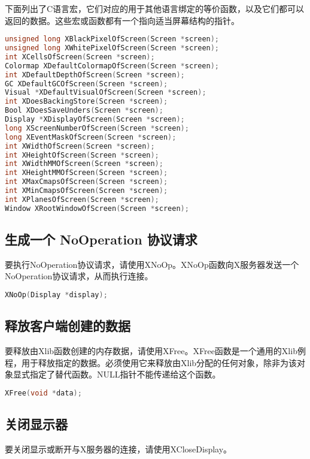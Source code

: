 \noindent 下面列出了C语言宏，它们对应的用于其他语言绑定的等价函数，以及它们都可以返回的数据。这些宏或函数都有一个指向适当屏幕结构的指针。
\begin{lstlisting}[language=C]
unsigned long XBlackPixelOfScreen(Screen *screen);
unsigned long XWhitePixelOfScreen(Screen *screen);
int XCellsOfScreen(Screen *screen);
Colormap XDefaultColormapOfScreen(Screen *screen);
int XDefaultDepthOfScreen(Screen *screen);
GC XDefaultGCOfScreen(Screen *screen);
Visual *XDefaultVisualOfScreen(Screen *screen);
int XDoesBackingStore(Screen *screen);
Bool XDoesSaveUnders(Screen *screen);
Display *XDisplayOfScreen(Screen *screen);
long XScreenNumberOfScreen(Screen *screen);
long XEventMaskOfScreen(Screen *screen);
int XWidthOfScreen(Screen *screen);
int XHeightOfScreen(Screen *screen);
int XWidthMMOfScreen(Screen *screen);
int XHeightMMOfScreen(Screen *screen);
int XMaxCmapsOfScreen(Screen *screen);
int XMinCmapsOfScreen(Screen *screen);
int XPlanesOfScreen(Screen *screen);
Window XRootWindowOfScreen(Screen *screen);
\end{lstlisting}

\subsection{生成一个 NoOperation 协议请求}

\noindent 要执行NoOperation协议请求，请使用XNoOp。XNoOp函数向X服务器发送一个NoOperation协议请求，从而执行连接。
\begin{lstlisting}[language=C]
XNoOp(Display *display);
\end{lstlisting}

\subsection{释放客户端创建的数据}

\noindent 要释放由Xlib函数创建的内存数据，请使用XFree。XFree函数是一个通用的Xlib例程，用于释放指定的数据。必须使用它来释放由Xlib分配的任何对象，除非为该对象显式指定了替代函数。NULL指针不能传递给这个函数。
\begin{lstlisting}[language=C]
XFree(void *data);
\end{lstlisting}

\subsection{关闭显示器}

\noindent 要关闭显示或断开与X服务器的连接，请使用XCloseDisplay。

